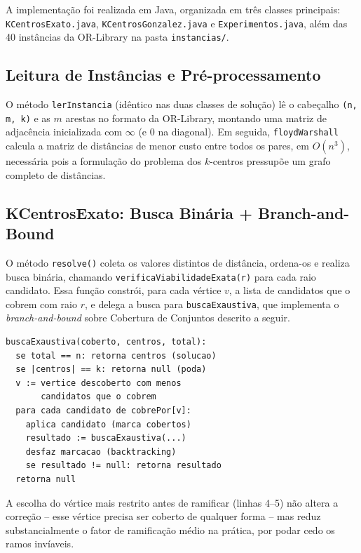 \documentclass[10pt,twocolumn]{article}
\begin{document}
A implementa\c{c}\~ao foi realizada em Java, organizada em tr\^es classes principais:
\texttt{KCentrosExato.java}, \texttt{KCentrosGonzalez.java} e
\texttt{Experimentos.java}, al\'em das 40 inst\^ancias da OR-Library na pasta
\texttt{instancias/}.

\subsection{Leitura de Inst\^ancias e Pr\'e-processamento}

O m\'etodo \texttt{lerInstancia} (id\^entico nas duas classes de solu\c{c}\~ao) l\^e o
cabe\c{c}alho \texttt{(n, m, k)} e as $m$ arestas no formato da OR-Library, montando uma
matriz de adjac\^encia inicializada com $\infty$ (e $0$ na diagonal). Em seguida,
\texttt{floydWarshall} calcula a matriz de dist\^ancias de menor custo entre todos os
pares, em $O(n^3)$, necess\'aria pois a formula\c{c}\~ao do problema dos $k$-centros
pressup\~oe um grafo completo de dist\^ancias.

\subsection{KCentrosExato: Busca Bin\'aria + Branch-and-Bound}

O m\'etodo \texttt{resolve()} coleta os valores distintos de dist\^ancia, ordena-os e
realiza busca bin\'aria, chamando \texttt{verificaViabilidadeExata(r)} para cada raio
candidato. Essa fun\c{c}\~ao constr\'oi, para cada v\'ertice $v$, a lista de candidatos
que o cobrem com raio $r$, e delega a busca para \texttt{buscaExaustiva}, que implementa
o \emph{branch-and-bound} sobre Cobertura de Conjuntos descrito a seguir.

\begin{lstlisting}[caption={Esqueleto do branch-and-bound (most-constrained-first).},label={lst:bb}]
buscaExaustiva(coberto, centros, total):
  se total == n: retorna centros (solucao)
  se |centros| == k: retorna null (poda)
  v := vertice descoberto com menos
       candidatos que o cobrem
  para cada candidato de cobrePor[v]:
    aplica candidato (marca cobertos)
    resultado := buscaExaustiva(...)
    desfaz marcacao (backtracking)
    se resultado != null: retorna resultado
  retorna null
\end{lstlisting}

A escolha do v\'ertice mais restrito antes de ramificar (linhas 4--5) n\~ao altera a
corre\c{c}\~ao -- esse v\'ertice precisa ser coberto de qualquer forma -- mas reduz
substancialmente o fator de ramifica\c{c}\~ao m\'edio na pr\'atica, por podar cedo os
ramos inv\'iaveis.
\end{document}
